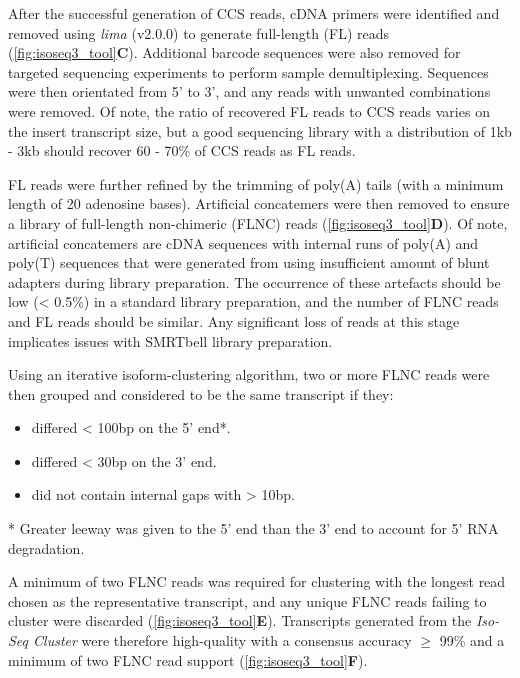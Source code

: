 After the successful generation of CCS reads, cDNA primers were identified and removed using \textit{lima} (v2.0.0) to generate full-length (FL) reads (\cref{fig:isoseq3_tool}\textbf{C}). Additional barcode sequences were also removed for targeted sequencing experiments to perform sample demultiplexing. Sequences were then orientated from 5’ to 3’, and any reads with unwanted combinations were removed. Of note, the ratio of recovered FL reads to CCS reads varies on the insert transcript size, but a good sequencing library with a distribution of 1kb - 3kb should recover 60 - 70\% of CCS reads as FL reads.   

FL reads were further refined by the trimming of poly(A) tails (with a minimum length of 20 adenosine bases). Artificial concatemers were then removed to ensure a library of full-length non-chimeric (FLNC) reads (\cref{fig:isoseq3_tool}\textbf{D}). Of note, artificial concatemers are cDNA sequences with internal runs of poly(A) and poly(T) sequences that were generated from using insufficient amount of blunt adapters during library preparation. The occurrence of these artefacts should be low (< 0.5\%) in a standard library preparation, and the number of FLNC reads and FL reads should be similar. Any significant loss of reads at this stage implicates issues with SMRTbell library preparation.

Using an iterative isoform-clustering algorithm, two or more FLNC reads were then grouped and considered to be the same transcript if they: 
\begin{itemize}
	\item differed < 100bp on the 5’ end*. 
	\item differed < 30bp on the 3’ end. 
	\item did not contain internal gaps with > 10bp.
\end{itemize}
* Greater leeway was given to the 5' end than the 3' end to account for 5' RNA degradation.

A minimum of two FLNC reads was required for clustering with the longest read chosen as the representative transcript, and any unique FLNC reads failing to cluster were discarded (\cref{fig:isoseq3_tool}\textbf{E}). Transcripts generated from the \textit{Iso-Seq Cluster} were therefore high-quality with a consensus accuracy $\geq$ 99\% and a minimum of two FLNC read support (\cref{fig:isoseq3_tool}\textbf{F}). 


